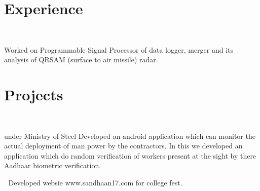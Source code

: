 \documentclass[a4paper]{deedy-resume} %
\begin{document}
\hfill
%
%
\begin{minipage}[t]{0.66\textwidth} %


\section{Experience}

\\

\vspace{\topsep} %
\begin{tightitemize}
\item Worked on Programmable Signal Processor of data logger, merger and its analysis of QRSAM (surface to air missile) radar.

\end{tightitemize}

\sectionspace %

\section{Projects}

\\

\begin{tightitemize}
\item under Ministry of Steel Developed an android application which can monitor the actual deployment of man power by the contractors. In this we developed an application which do random verification of workers present at the sight by there Aadhaar biometric verification.

\end{tightitemize}
  Developed websie www.sandhaan17.com for college fest. 
 



\end{minipage}
\end{document}
